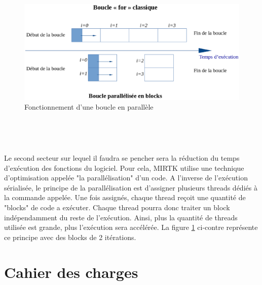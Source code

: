 \documentclass[10pt]{report}
\begin{document}
	\vspace{-1cm}
	\begin{figure}
		\includegraphics[width=12cm]{Reports/figures/gfor.eps}	
		\caption{Fonctionnement d'une boucle en parallèle}
		\label{Fonctionnement d'une boucle en parallèle}
	\end{figure}
	~\par~\par
	Le second secteur sur lequel il faudra se pencher sera la réduction du temps d'exécution des fonctions du logiciel. Pour cela, MIRTK utilise une technique d'optimisation appelée "la parallélisation" d'un code. A l'inverse de l'exécution sérialisée, le principe de la parallélisation est d'assigner plusieurs threads dédiés à la commande appelée. Une fois assignés, chaque thread reçoit une quantité de "blocks" de code a exécuter. Chaque thread pourra donc traiter un block indépendamment du reste de l'exécution. Ainsi, plus la quantité de threads utilisée est grande, plus l'exécution sera accélérée. La figure \ref{Fonctionnement d'une boucle en parallèle} ci-contre représente ce principe avec des blocks de 2 itérations. \vspace{1,5cm}\\

	

	\section{Cahier des charges}
\end{document}
